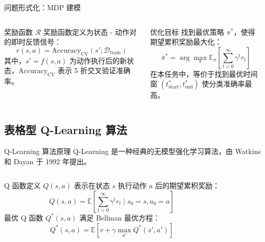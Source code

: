 {\begin{frame}{问题形式化：MDP 建模}
\begin{columns}[T]
        \begin{block}{奖励函数 $\mathcal{R}$}
            \scriptsize
            奖励函数定义为状态 - 动作对的即时反馈信号：
            \begin{equation*}
            r(s, a) = \text{Accuracy}_{\text{CV}}(s'; \mathcal{D}_{\text{train}})
            \end{equation*}
            其中，$s' = f(s, a)$ 为动作执行后的新状态，$\text{Accuracy}_{\text{CV}}$ 表示 5 折交叉验证准确率。
        \end{block}

        \begin{alertblock}{优化目标}
            \scriptsize
            找到最优策略 $\pi^*$，使得期望累积奖励最大化：
            \begin{equation*}
            \pi^* = \arg\max_{\pi} \mathbb{E}_{\pi} \left[ \sum_{t=0}^{\infty} \gamma^t r_t \right]
            \end{equation*}
            在本任务中，等价于找到最优时间窗 $(t_{\text{start}}^*, t_{\text{end}}^*)$ 使分类准确率最高。
        \end{alertblock}
    \end{columns}

\end{frame}

\subsection{表格型 Q-Learning 算法}

\begin{frame}{Q-Learning 算法原理}
    Q-Learning 是一种经典的无模型强化学习算法，由 Watkins 和 Dayan 于 1992 年提出\cite{watkins1992q}。

    \vspace{0.25cm}
    \begin{columns}[T]
        \begin{block}{Q 函数定义}
            \scriptsize
            $Q(s, a)$ 表示在状态 $s$ 执行动作 $a$ 后的期望累积奖励：
            \begin{equation*}
            Q(s, a) = \mathbb{E} \left[ \sum_{t=0}^{\infty} \gamma^t r_t \mid s_0 = s, a_0 = a \right]
            \end{equation*}
            最优 Q 函数 $Q^*(s, a)$ 满足 Bellman 最优方程：
            \begin{equation*}
            Q^*(s, a) = \mathbb{E} \left[ r + \gamma \max_{a'} Q^*(s', a') \right]
            \end{equation*}
        \end{block}


\end{columns}
\end{frame}}
